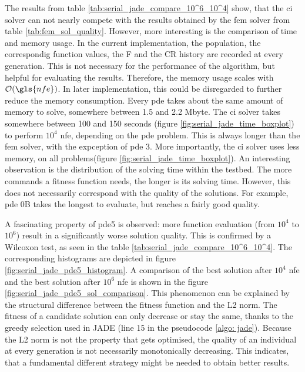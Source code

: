 \documentclass[./\jobname.tex]{subfiles}
\begin{document}
The results from table \ref{tab:serial_jade_compare_10^6_10^4} show, that the \gls{ci} solver can not nearly compete with the results obtained by the \gls{fem} solver from table \ref{tab:fem_sol_quality}. 
However, more interesting is the comparison of time and memory usage. 
In the current implementation, the population, the correspondig function values, the F and the CR history are recorded at every generation. This is not necessary for the performance of the algorithm, but helpful for evaluating the results. Therefore, the memory usage scales with $\mathcal{O}(\gls{nfe})$. In later implementation, this could be disregarded to further reduce the memory consumption. Every \gls{pde} takes about the same amount of memory to solve, somewhere between 1.5 and 2.2 Mbyte. 
The \gls{ci} solver takes somewhere between 100 and 150 seconds (figure \ref{fig:serial_jade_time_boxplot}) to perform $10^4$ \gls{nfe}, depending on the \gls{pde} problem. This is always longer than the \gls{fem} solver, with the expception of \gls{pde} 3. More importantly, the \gls{ci} solver uses less memory, on all problems(figure \ref{fig:serial_jade_time_boxplot}). An interesting observation is the distribution of the solving time within the testbed. The more commands a fitness function needs, the longer is its solving time. However, this does not necessarily correspond with the quality of the solutions. For example, \gls{pde} 0B takes the longest to evaluate, but reaches a fairly good quality. 

A fascinating property of \gls{pde}5 is observed: more function evaluation (from $10^4$ to $10^6$) result in a significantly worse solution quality. This is confirmed by a Wilcoxon test, as seen in the table \ref{tab:serial_jade_compare_10^6_10^4}. The corresponding histograms are depicted in figure \ref{fig:serial_jade_pde5_histogram}. 
A comparison of the best solution after $10^4$ \gls{nfe} and the best solution after $10^6$ \gls{nfe} is shown in the figure \ref{fig:serial_jade_pde5_sol_comparison}. This phenomenon can be explained by the structural difference between the fitness function and the L2 norm. The fitness of a candidate solution can only decrease or stay the same, thanks to the greedy selection used in JADE (line 15 in the pseudocode \ref{algo: jade}). Because the L2 norm is not the property that gets optimised, the quality of an individual at every generation is not necessarily monotonically decreasing. 
This indicates, that a fundamental different strategy might be needed to obtain better results. 
\end{document}
